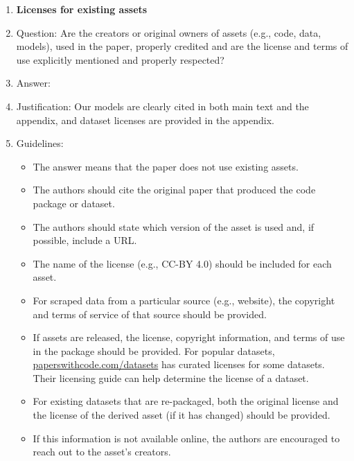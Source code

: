 \documentclass{article}
\begin{document}
\begin{enumerate}
\item {\bf Licenses for existing assets}
    \item[] Question: Are the creators or original owners of assets (e.g., code, data, models), used in the paper, properly credited and are the license and terms of use explicitly mentioned and properly respected?
    \item[] Answer: \answerYes{} %
    \item[] Justification: Our models are clearly cited in both main text and the appendix, and dataset licenses are provided in the appendix.
    \item[] Guidelines:
    \begin{itemize}
        \item The answer \answerNA{} means that the paper does not use existing assets.
        \item The authors should cite the original paper that produced the code package or dataset.
        \item The authors should state which version of the asset is used and, if possible, include a URL.
        \item The name of the license (e.g., CC-BY 4.0) should be included for each asset.
        \item For scraped data from a particular source (e.g., website), the copyright and terms of service of that source should be provided.
        \item If assets are released, the license, copyright information, and terms of use in the package should be provided. For popular datasets, \url{paperswithcode.com/datasets} has curated licenses for some datasets. Their licensing guide can help determine the license of a dataset.
        \item For existing datasets that are re-packaged, both the original license and the license of the derived asset (if it has changed) should be provided.
        \item If this information is not available online, the authors are encouraged to reach out to the asset's creators.
    \end{itemize}


\end{enumerate}
\end{document}
